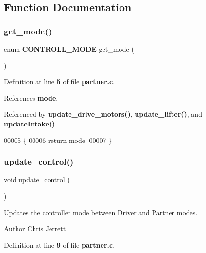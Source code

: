 \subsection{Function Documentation}
\mbox{\label{partner_8c_aacc86d07e59d3b919f5c5eae2ce5d404}} 
\subsubsection{get\+\_\+mode()}
{\footnotesize\ttfamily enum \textbf{ C\+O\+N\+T\+R\+O\+L\+L\+\_\+\+M\+O\+DE} get\+\_\+mode (\begin{DoxyParamCaption}{ }\end{DoxyParamCaption})}



Definition at line \textbf{ 5} of file \textbf{ partner.\+c}.



References \textbf{ mode}.



Referenced by \textbf{ update\+\_\+drive\+\_\+motors()}, \textbf{ update\+\_\+lifter()}, and \textbf{ update\+Intake()}.


\begin{DoxyCode}
00005                               \{
00006   \textcolor{keywordflow}{return} mode;
00007 \}
\end{DoxyCode}
\mbox{\label{partner_8c_ab2c78903a76d2ed8969271803c78368a}} 
\subsubsection{update\+\_\+control()}
{\footnotesize\ttfamily void update\+\_\+control (\begin{DoxyParamCaption}{ }\end{DoxyParamCaption})}



Updates the controller mode between Driver and Partner modes. 

\begin{DoxyAuthor}{Author}
Chris Jerrett 
\end{DoxyAuthor}


Definition at line \textbf{ 9} of file \textbf{ partner.\+c}.



